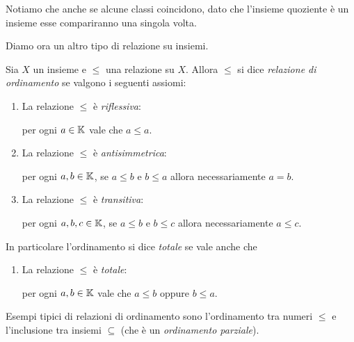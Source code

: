 Notiamo che anche se alcune classi coincidono, dato che l'insieme quoziente è un insieme esse compariranno una singola volta.

Diamo ora un altro tipo di relazione su insiemi.

\begin{definition}
    Sia $X$ un insieme e $\leq$ una relazione su $X$. Allora $\leq$ si dice \emph{relazione di ordinamento} se valgono i seguenti assiomi: \begin{enumerate}[label={(ORD\arabic*)}]
        \item La relazione $\leq$ è \emph{riflessiva}:
        
        per ogni $a \in \mathbb{K}$ vale che $a \leq a$.
        \item La relazione $\leq$ è \emph{antisimmetrica}:
        
        per ogni $a, b \in \mathbb{K}$, se $a \leq b$ e $b \leq a$ allora necessariamente $a = b$.
        \item La relazione $\leq$ è \emph{transitiva}:
        
        per ogni $a, b, c \in \mathbb{K}$, se $a \leq b$ e $b \leq c$ allora necessariamente $a \leq c$.
    \end{enumerate}

    In particolare l'ordinamento si dice \emph{totale} se vale anche che
    \begin{enumerate}[label={(O\arabic*)}, start=4]
        \item La relazione $\leq$ è \emph{totale}:
        
        per ogni $a, b \in \mathbb{K}$ vale che $a \leq b$ oppure $b \leq a$.
    \end{enumerate}
\end{definition}

Esempi tipici di relazioni di ordinamento sono l'ordinamento tra numeri $\leq$ e l'inclusione tra insiemi $\subseteq$ (che è un \emph{ordinamento parziale}).